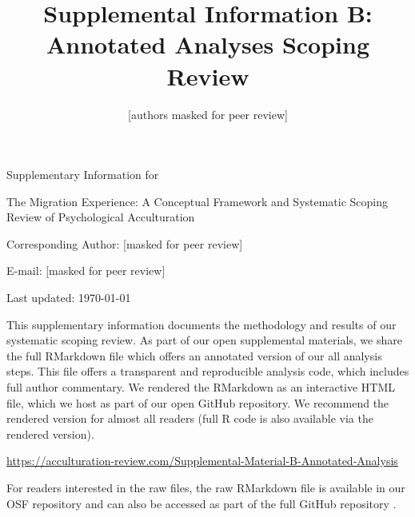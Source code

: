 \documentclass[man, 12pt, a4paper]{apa7}
\title{Supplemental Information B: Annotated Analyses Scoping Review}
\author{[authors masked for peer review]}
\begin{document}
\begin{titlepage}
	{\noindent\Large Supplementary Information for \par}
	\vspace{0.5cm}
	{\noindent\Large The Migration Experience: A Conceptual Framework and Systematic Scoping Review of Psychological Acculturation\par}
	\vspace{1.5cm}
	{\noindent\LARGE\bfseries \thetitle \par}
	\vspace{2cm}
	{\noindent\Large\itshape \theauthor \par}
	\vfill
	\noindent Corresponding Author: [masked for peer review]\par
	\noindent E-mail: [masked for peer review]\par
	\vfill

	{\noindent Last updated: \today\par}
\end{titlepage}

\begin{center}
   \textbf{\thetitle} 
\end{center}

This supplementary information documents the methodology and results of our systematic scoping review. As part of our open supplemental materials, we share the full RMarkdown file which offers an annotated version of our all analysis steps. This file offers a transparent and reproducible analysis code, which includes full author commentary. We rendered the RMarkdown as an interactive HTML file, which we host as part of our open GitHub repository. We recommend the rendered version for almost all readers (full R code is also available via the rendered version).

\vspace{.5cm}
\begin{tcolorbox}
    \vspace{0.2cm} \centering 
    \href{https://acculturation-review.com/Supplemental-Material-B-Annotated-Analysis}{https://acculturation-review.com/Supplemental-Material-B-Annotated-Analysis}
    \vspace{0.2cm} 
\end{tcolorbox}

For readers interested in the raw files, the raw RMarkdown file is available in our OSF repository \citep[see][]{Kreienkamp2021e} and can also be accessed as part of the full GitHub repository \citep[][]{Kreienkamp2021d}.

\printbibliography
\end{document}
